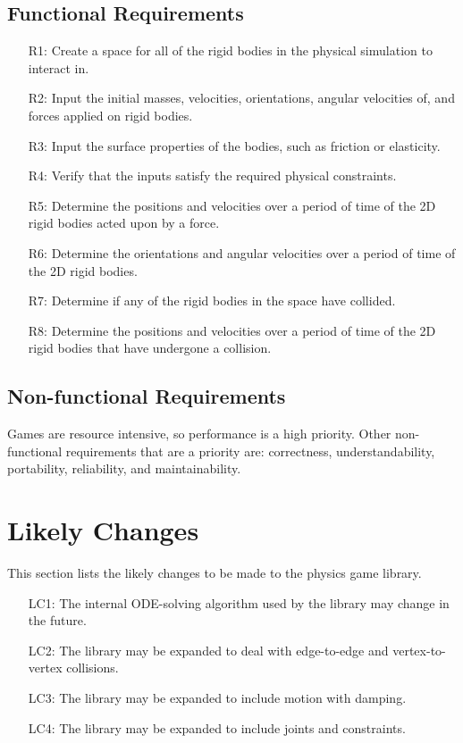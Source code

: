 \documentclass[12pt]{article}
\begin{document}
\subsection{Functional Requirements}
\label{Sec:FR}
\begin{itemize}
\item[R1:]Create a space for all of the rigid bodies in the physical simulation to interact in.
\item[R2:]Input the initial masses, velocities, orientations, angular velocities of, and forces applied on rigid bodies.
\item[R3:]Input the surface properties of the bodies, such as friction or elasticity.
\item[R4:]Verify that the inputs satisfy the required physical constraints.
\item[R5:]Determine the positions and velocities over a period of time of the 2D rigid bodies acted upon by a force.
\item[R6:]Determine the orientations and angular velocities over a period of time of the 2D rigid bodies.
\item[R7:]Determine if any of the rigid bodies in the space have collided.
\item[R8:]Determine the positions and velocities over a period of time of the 2D rigid bodies that have undergone a collision.
\end{itemize}
\subsection{Non-functional Requirements}
\label{Sec:NR}
Games are resource intensive, so performance is a high priority. Other non-functional requirements that are a priority are: correctness, understandability, portability, reliability, and maintainability.
\section{Likely Changes}
\label{Sec:LC}
This section lists the likely changes to be made to the physics game library.
\begin{itemize}
\item[LC1:]The internal ODE-solving algorithm used by the library may change in the future.
\item[LC2:]The library may be expanded to deal with edge-to-edge and vertex-to-vertex collisions.
\item[LC3:]The library may be expanded to include motion with damping.
\item[LC4:]The library may be expanded to include joints and constraints.
\end{itemize}
\end{document}

